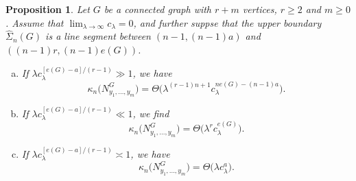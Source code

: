 \documentclass[12pt]{article}
\newtheorem{prop}{Proposition}[section]
\numberwithin{equation}{section}
\begin{document}
\begin{prop}\label{lm:slope2}
  Let $G$ be a connected graph with $r+m$ vertices, $r\ge2$ and $m\ge0$. Assume that $\lim_{\lambda \to \infty} c_\lambda =0$, and further suppse that the upper boundary $\widehat{\Sigma}_n(G)$ is a line segment between $(n-1,(n-1)a)$ and $((n-1)r,(n-1)e(G))$. 
  \begin{enumerate}[a)]
    \item If $\lambda c_\lambda^{[e(G)-a]/ ( r-1 )}\gg1$, we have
  \begin{equation} 
    \kappa_n\big(N_{y_1,\ldots , y_m}^G\big)=\Theta\big(\lambda^{(r-1)n+1}c_\lambda^{ne(G)-(n-1)a}\big). 
  \end{equation}
  \item If $\lambda c_\lambda^{[e(G)-a]/ ( r-1 )}\ll1$, we find 
  \begin{equation}
    \kappa_n\big(N_{y_1,\ldots , y_m}^G\big)=\Theta\big(\lambda^{r}c_\lambda^{e(G)}\big).
  \end{equation}
  \item If $\lambda c_\lambda^{[e(G)-a]/ ( r-1 )}\asymp 1$, we have
  \begin{equation}
    \kappa_n\big(N_{y_1,\ldots , y_m}^G\big)=\Theta\big(\lambda c_{\lambda}^a\big).  
  \end{equation}
  \end{enumerate} 
\end{prop}
\end{document}
